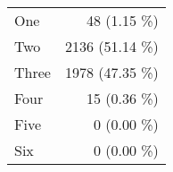 \begin{tabular}{ l  r }
One & 48 (1.15 \%)\\
Two & 2136 (51.14 \%)\\
Three & 1978 (47.35 \%)\\
Four & 15 (0.36 \%)\\
Five & 0 (0.00 \%)\\
Six & 0 (0.00 \%)\\
\end{tabular}
